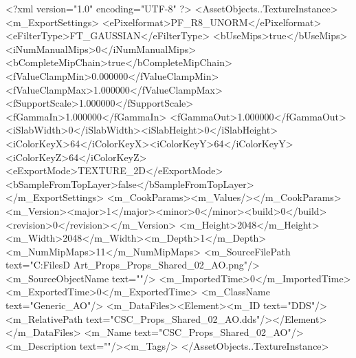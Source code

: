 <?xml version="1.0" encoding="UTF-8" ?>
<AssetObjects..TextureInstance>
	<m_ExportSettings>
		<ePixelformat>PF_R8_UNORM</ePixelformat>
		<eFilterType>FT_GAUSSIAN</eFilterType>
		<bUseMips>true</bUseMips>
		<iNumManualMips>0</iNumManualMips>
		<bCompleteMipChain>true</bCompleteMipChain>
		<fValueClampMin>0.000000</fValueClampMin>
		<fValueClampMax>1.000000</fValueClampMax>
		<fSupportScale>1.000000</fSupportScale>
		<fGammaIn>1.000000</fGammaIn>
		<fGammaOut>1.000000</fGammaOut>
		<iSlabWidth>0</iSlabWidth><iSlabHeight>0</iSlabHeight>
		<iColorKeyX>64</iColorKeyX><iColorKeyY>64</iColorKeyY><iColorKeyZ>64</iColorKeyZ>
		<eExportMode>TEXTURE_2D</eExportMode><bSampleFromTopLayer>false</bSampleFromTopLayer>
	</m_ExportSettings>
	<m_CookParams><m_Values/></m_CookParams>
	<m_Version><major>1</major><minor>0</minor><build>0</build><revision>0</revision></m_Version>
	<m_Height>2048</m_Height><m_Width>2048</m_Width><m_Depth>1</m_Depth>
	<m_NumMipMaps>11</m_NumMipMaps>
	<m_SourceFilePath text="C:\Users\Shadow\Desktop\Working Files\3D Art\Textures\CSC_Props\Current\textures\CSC_Props_Shared_02_AO.png"/>
	<m_SourceObjectName text=""/>
	<m_ImportedTime>0</m_ImportedTime><m_ExportedTime>0</m_ExportedTime>
	<m_ClassName text="Generic_AO"/>
	<m_DataFiles><Element><m_ID text="DDS"/><m_RelativePath text="CSC_Props_Shared_02_AO.dds"/></Element></m_DataFiles>
	<m_Name text="CSC_Props_Shared_02_AO"/><m_Description text=""/><m_Tags/>
</AssetObjects..TextureInstance>
